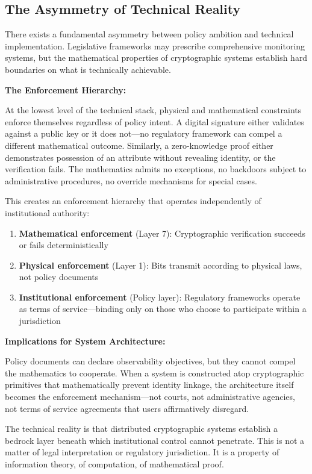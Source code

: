\documentclass[11pt,a4paper]{article}
\begin{document}
\subsection{The Asymmetry of Technical Reality}

There exists a fundamental asymmetry between policy ambition and technical implementation. Legislative frameworks may prescribe comprehensive monitoring systems, but the mathematical properties of cryptographic systems establish hard boundaries on what is technically achievable.

\textbf{The Enforcement Hierarchy:}

At the lowest level of the technical stack, physical and mathematical constraints enforce themselves regardless of policy intent. A digital signature either validates against a public key or it does not---no regulatory framework can compel a different mathematical outcome. Similarly, a zero-knowledge proof either demonstrates possession of an attribute without revealing identity, or the verification fails. The mathematics admits no exceptions, no backdoors subject to administrative procedures, no override mechanisms for special cases.

This creates an enforcement hierarchy that operates independently of institutional authority:

\begin{enumerate}
    \item \textbf{Mathematical enforcement} (Layer 7): Cryptographic verification succeeds or fails deterministically
    \item \textbf{Physical enforcement} (Layer 1): Bits transmit according to physical laws, not policy documents
    \item \textbf{Institutional enforcement} (Policy layer): Regulatory frameworks operate as terms of service---binding only on those who choose to participate within a jurisdiction
\end{enumerate}

\textbf{Implications for System Architecture:}

Policy documents can declare observability objectives, but they cannot compel the mathematics to cooperate. When a system is constructed atop cryptographic primitives that mathematically prevent identity linkage, the architecture itself becomes the enforcement mechanism---not courts, not administrative agencies, not terms of service agreements that users affirmatively disregard.

The technical reality is that distributed cryptographic systems establish a bedrock layer beneath which institutional control cannot penetrate. This is not a matter of legal interpretation or regulatory jurisdiction. It is a property of information theory, of computation, of mathematical proof.
\end{document}
